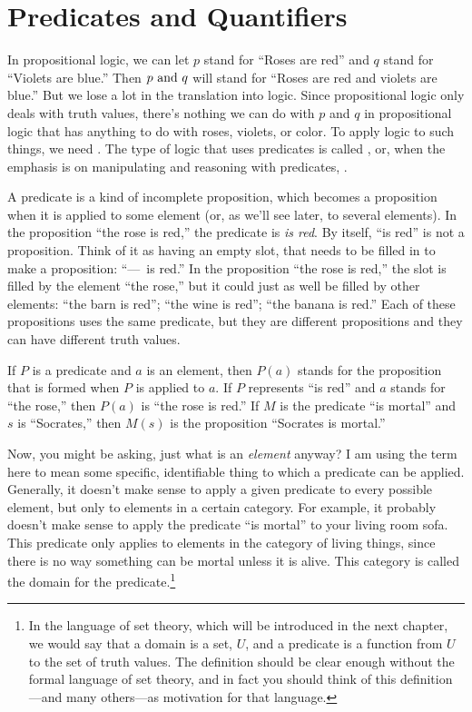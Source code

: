 \section{Predicates and Quantifiers}\label{S-logic-4}

In propositional logic, we can let $p$ stand for ``Roses are red'' and
$q$ stand for ``Violets are blue.''  Then $p\text{ and } q$ will stand for
``Roses are red and violets are blue.''  But we lose a lot in the
translation into logic.  Since propositional logic only deals with
truth values, there's nothing we can do with $p$ and $q$ in propositional
logic that has anything to do with roses, violets, or color.
To apply logic to such things, we need .
The type of logic that uses predicates is called , or, when the emphasis is on manipulating and reasoning
with predicates, .

A predicate is a kind of incomplete proposition, which becomes
a proposition when it is applied to some element (or, as we'll see later,
to several elements).  In the proposition ``the rose is red,'' the
predicate is \emph{is red}.  By itself, ``is red'' is not a proposition.
Think of it as having an empty slot, that needs to be filled in
to make a proposition: ``---~is red.''  In the proposition
``the rose is red,'' the slot is filled by the element ``the rose,''
but it could just as well be filled by other elements:
``the barn is red''; ``the wine is red''; ``the banana is red.''
Each of these propositions uses the same predicate, but they are
different propositions and they can have different truth values.

If $P$ is a predicate and $a$ is an element, then $P(a)$ stands for
the proposition that is formed when $P$ is applied to $a$.  If $P$
represents ``is red'' and $a$ stands for ``the rose,'' then
$P(a)$ is ``the rose is red.''  If $M$ is the predicate
``is mortal'' and $s$ is ``Socrates,'' then $M(s)$ is the proposition
``Socrates is mortal.'' 

Now, you might be asking, just what is an \emph{element} anyway?
I am using the term here to mean some specific, identifiable thing
to which a predicate can be applied.  Generally, it doesn't make
sense to apply a given predicate to every possible element, but only
to elements in a certain category.  For example, it probably doesn't
make sense to apply the predicate ``is mortal'' to your living room
sofa.  This predicate only applies to elements in the category of
living things, since there is no way something can be mortal unless it
is alive.  This category is called the domain for
the predicate.\footnote{In the language
of set theory, which will be introduced in the next chapter,
we would say that a domain is a set, $U$, and
a predicate is a function from $U$ to the set of truth values.
The definition should be clear enough without the formal language
of set theory, and in fact you should think of this definition---and
many others---as motivation for that language.}

